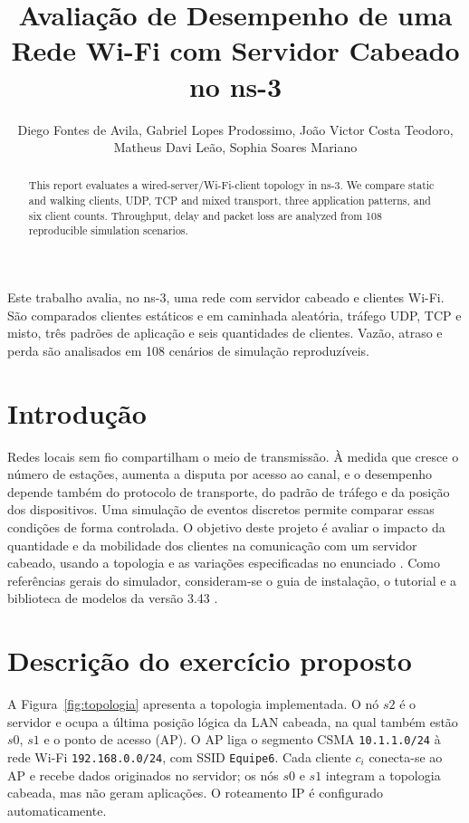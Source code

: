 \documentclass[12pt]{article}
\title{Avaliação de Desempenho de uma Rede Wi-Fi com Servidor Cabeado no ns-3}
\author{Diego Fontes de Avila\inst{1}, Gabriel Lopes Prodossimo\inst{1},
  João Victor Costa Teodoro\inst{1},\\ Matheus Davi Leão\inst{1},
  Sophia Soares Mariano\inst{1}}
\begin{document}
\maketitle

\begin{abstract}
This report evaluates a wired-server/Wi-Fi-client topology in ns-3. We compare
static and walking clients, UDP, TCP and mixed transport, three application
patterns, and six client counts. Throughput, delay and packet loss are analyzed
from 108 reproducible simulation scenarios.
\end{abstract}

\begin{resumo}
Este trabalho avalia, no ns-3, uma rede com servidor cabeado e clientes Wi-Fi.
São comparados clientes estáticos e em caminhada aleatória, tráfego UDP, TCP e
misto, três padrões de aplicação e seis quantidades de clientes. Vazão, atraso
e perda são analisados em 108 cenários de simulação reproduzíveis.
\end{resumo}

\section{Introdução}
Redes locais sem fio compartilham o meio de transmissão. À medida que cresce
o número de estações, aumenta a disputa por acesso ao canal, e o desempenho
depende também do protocolo de transporte, do padrão de tráfego e da posição
dos dispositivos. Uma simulação de eventos discretos permite comparar essas
condições de forma controlada. O objetivo deste projeto é avaliar o impacto
da quantidade e da mobilidade dos clientes na comunicação com um servidor
cabeado, usando a topologia e as variações especificadas no enunciado
\cite{projeto}. Como referências gerais do simulador, consideram-se o guia
de instalação, o tutorial e a biblioteca de modelos da versão 3.43
\cite{instalacao,tutorial,modelos}.

\section{Descrição do exercício proposto}
A Figura~\ref{fig:topologia} apresenta a topologia implementada. O nó \(s2\)
é o servidor e ocupa a última posição lógica da LAN cabeada, na qual também
estão \(s0\), \(s1\) e o ponto de acesso (AP). O AP liga o segmento CSMA
\texttt{10.1.1.0/24} à rede Wi-Fi \texttt{192.168.0.0/24}, com SSID
\texttt{Equipe6}. Cada cliente \(c_i\) conecta-se ao AP e recebe dados
originados no servidor; os nós \(s0\) e \(s1\) integram a topologia cabeada,
mas não geram aplicações. O roteamento IP é configurado automaticamente.
\end{document}
